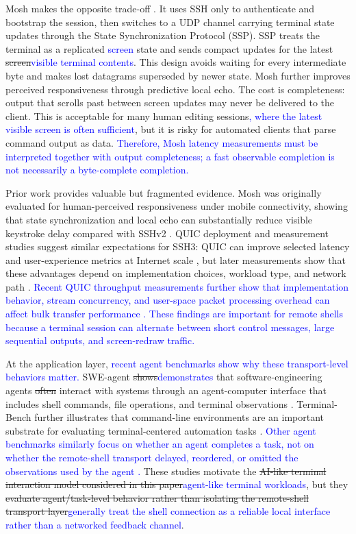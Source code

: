 Mosh makes the opposite trade-off \cite{Winstein2012}. It uses SSH only to authenticate and bootstrap the session, then switches to a UDP channel carrying terminal state updates through the State Synchronization Protocol (SSP). SSP treats the terminal as a replicated \textcolor{blue}{screen} state and sends compact updates for the latest \sout{screen}\textcolor{blue}{visible terminal contents}. This design avoids waiting for every intermediate byte and makes lost datagrams superseded by newer state. Mosh further improves perceived responsiveness through predictive local echo. The cost is completeness: output that scrolls past between screen updates may never be delivered to the client. This is acceptable for many human editing sessions\textcolor{blue}{, where the latest visible screen is often sufficient}, but it is risky for automated clients that parse command output as data. \textcolor{blue}{Therefore, Mosh latency measurements must be interpreted together with output completeness; a fast observable completion is not necessarily a byte-complete completion.}

Prior work provides valuable but fragmented evidence. Mosh was originally evaluated for human-perceived responsiveness under mobile connectivity, showing that state synchronization and local echo can substantially reduce visible keystroke delay compared with SSHv2 \cite{Winstein2012}. QUIC deployment and measurement studies suggest similar expectations for SSH3: QUIC can improve selected latency and user-experience metrics at Internet scale \cite{Langley2017}, but later measurements show that these advantages depend on implementation choices, workload type, and network path \cite{Kakhki2017}. \textcolor{blue}{Recent QUIC throughput measurements further show that implementation behavior, stream concurrency, and user-space packet processing overhead can affect bulk transfer performance \cite{Konig2025}. These findings are important for remote shells because a terminal session can alternate between short control messages, large sequential outputs, and screen-redraw traffic.}

At the application layer, \textcolor{blue}{recent agent benchmarks show why these transport-level behaviors matter. }SWE-agent \sout{shows}\textcolor{blue}{demonstrates} that software-engineering agents \sout{often }interact with systems through an agent-computer interface that includes shell commands, file operations, and terminal observations \cite{Yang2024}. Terminal-Bench further illustrates that command-line environments are an important substrate for evaluating terminal-centered automation tasks \cite{merrill2026}. \textcolor{blue}{Other agent benchmarks similarly focus on whether an agent completes a task, not on whether the remote-shell transport delayed, reordered, or omitted the observations used by the agent \cite{Liu2024}.} These studies motivate the \sout{AI-like terminal interaction model considered in this paper}\textcolor{blue}{agent-like terminal workloads}, but they \sout{evaluate agent/task-level behavior rather than isolating the remote-shell transport layer}\textcolor{blue}{generally treat the shell connection as a reliable local interface rather than a networked feedback channel}.


